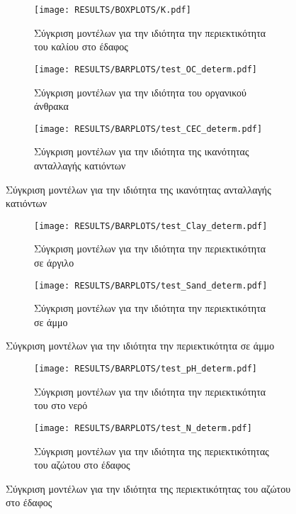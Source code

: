 \begin{figure}[H]
    \begin{subfigure}{0.5\textwidth}
        \texttt{[image: RESULTS/BOXPLOTS/K.pdf]}
        \caption{Σύγκριση μοντέλων για την ιδιότητα την περιεκτικότητα του καλίου στο έδαφος}
        \label{fig:subim9}
    \end{subfigure}
    \begin{subfigure}{0.5\textwidth}
        
    \end{subfigure}
\end{figure}

\begin{figure}[H]
    \begin{subfigure}{0.5\textwidth}
        \texttt{[image: RESULTS/BARPLOTS/test\_OC\_determ.pdf]}
        \caption{Σύγκριση μοντέλων για την ιδιότητα του οργανικού άνθρακα}
        \label{fig:subim1}
    \end{subfigure}
    \begin{subfigure}{0.5\textwidth}
        \texttt{[image: RESULTS/BARPLOTS/test\_CEC\_determ.pdf]}
        \caption{Σύγκριση μοντέλων για την ιδιότητα της ικανότητας ανταλλαγής κατιόντων}
        \label{fig:subim2}
    \end{subfigure}
\end{figure}
\begin{figure}[H]
    \begin{subfigure}{0.5\textwidth}
        \texttt{[image: RESULTS/BARPLOTS/test\_Clay\_determ.pdf]}
        \caption{Σύγκριση μοντέλων για την ιδιότητα την περιεκτικότητα σε άργιλο}
        \label{fig:subim3}
    \end{subfigure}
    \begin{subfigure}{0.5\textwidth}
        \texttt{[image: RESULTS/BARPLOTS/test\_Sand\_determ.pdf]}
        \caption{Σύγκριση μοντέλων για την ιδιότητα την περιεκτικότητα σε άμμο}
        \label{fig:subim4}
    \end{subfigure}
\end{figure}
\begin{figure}[H]
    \begin{subfigure}{0.5\textwidth}
        \texttt{[image: RESULTS/BARPLOTS/test\_pH\_determ.pdf]}
        \caption{Σύγκριση μοντέλων για την ιδιότητα την περιεκτικότητα του  στο νερό}
        \label{fig:subim5}
    \end{subfigure}
    \begin{subfigure}{0.5\textwidth}
        \texttt{[image: RESULTS/BARPLOTS/test\_N\_determ.pdf]}
        \caption{Σύγκριση μοντέλων για την ιδιότητα της περιεκτικότητας του αζώτου στο έδαφος}
        \label{fig:subim6}
    \end{subfigure}
\end{figure}
